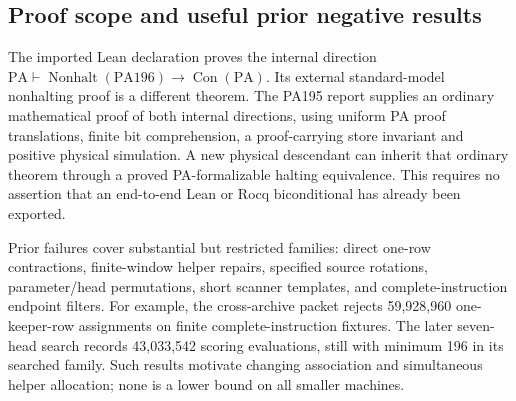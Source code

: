 \subsection{Proof scope and useful prior negative results}
The imported Lean declaration proves the internal direction
\(\mathrm{PA}\vdash\operatorname{Nonhalt}(\mathrm{PA196})\to
\operatorname{Con}(\mathrm{PA})\). Its external standard-model nonhalting
proof is a different theorem. The PA195 report supplies an ordinary
mathematical proof of both internal directions, using uniform PA proof
translations, finite bit comprehension, a proof-carrying store invariant and
positive physical simulation. A new physical descendant can inherit that
ordinary theorem through a proved PA-formalizable halting equivalence.
This requires no assertion that an end-to-end Lean or Rocq biconditional has
already been exported.

Prior failures cover substantial but restricted families: direct one-row
contractions, finite-window helper repairs, specified source rotations,
parameter/head permutations, short scanner templates, and complete-instruction
endpoint filters. For example, the cross-archive packet rejects 59,928,960
one-keeper-row assignments on finite complete-instruction fixtures. The later
seven-head search records 43,033,542 scoring evaluations, still with minimum
196 in its searched family. Such results motivate changing association and
simultaneous helper allocation; none is a lower bound on all smaller machines.
